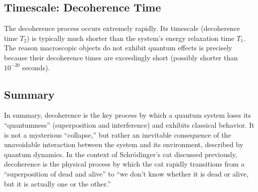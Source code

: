 \subsection{Timescale: Decoherence Time}

The decoherence process occurs extremely rapidly. Its timescale (decoherence time $T_2$) is typically much shorter than the system's energy relaxation time $T_1$. The reason macroscopic objects do not exhibit quantum effects is precisely because their decoherence times are exceedingly short (possibly shorter than $10^{-20}$ seconds).

\subsection{Summary}

In summary, decoherence is the key process by which a quantum system loses its ``quantumness'' (superposition and interference) and exhibits classical behavior. It is not a mysterious ``collapse,'' but rather an inevitable consequence of the unavoidable interaction between the system and its environment, described by quantum dynamics. In the context of Schr\"odinger's cat discussed previously, decoherence is the physical process by which the cat rapidly transitions from a ``superposition of dead and alive'' to ``we don't know whether it is dead or alive, but it is actually one or the other.''
